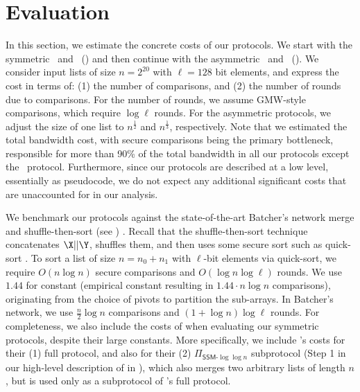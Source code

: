 \section{Evaluation}\label{sec:eval}

In this section, we estimate the concrete costs of our protocols. We start with the symmetric \ourprotocol\ and \ourprotocoltwo\ () and then continue with the asymmetric \sqrtmergeprotocol\ and \knmergeprotocol\ ().
We consider input lists of size $n = 2^{20}$ with $\ell = 128$ bit elements, and express the cost in terms of: (1) the number of comparisons, and (2) the number of rounds due to comparisons. For the number of rounds, we assume GMW-style comparisons, which require $\log \ell$ rounds. For the asymmetric protocols, we adjust the size of one list to $n^{\frac{1}{2}}$ and $n^{\frac{1}{3}}$, respectively.
Note that we estimated the total bandwidth cost, with secure comparisons being the primary bottleneck, responsible for more than 90\% of the total bandwidth in all our protocols except the \sqrtmergeprotocol\ protocol. Furthermore, since our protocols are described at a low level, essentially as pseudocode, we do not expect any additional significant costs that are unaccounted for in our analysis.





We benchmark our protocols against the state-of-the-art Batcher's network merge and shuffle-then-sort (see ) . Recall that the shuffle-then-sort technique concatenates $\X||\Y$, shuffles them, and then uses some secure sort such as quick-sort \cite{ICISC:HKICT12,EPRINT:PRRS23}.
To sort a list of size $n = n_0+n_1$ with $\ell$-bit elements via quick-sort, we require $O(n\log n)$ secure comparisons and $O(\log n \log \ell)$ rounds. We use $1.44$ for constant (empirical constant resulting in $1.44\cdot n\log n$ comparisons), originating from the choice of pivots to partition the sub-arrays. 
In Batcher's network, we use $\frac{n}{2}\log n$ comparisons and $(1+\log n) \log \ell$ rounds.
For completeness, we also include the costs of \cite{EPRINT:BBDLO22} when evaluating our symmetric protocols, despite their large constants.
More specifically, we include \cite{EPRINT:BBDLO22}'s costs for their (1) full protocol, and also for their (2) $\Pi_{\textsf{SSM-}{\log}{\log} n}$ subprotocol (Step 1 in our high-level description of \cite{EPRINT:BBDLO22} in ), which also merges two arbitrary lists of length $n$, but is used only as a subprotocol of \cite{EPRINT:BBDLO22}'s full protocol.

